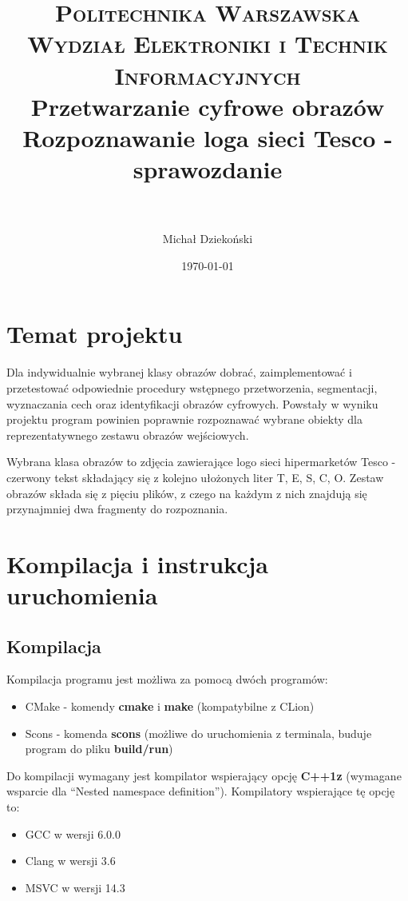\documentclass[11pt,a4paper]{article} %
\title{
\normalfont \normalsize
\textsc{Politechnika Warszawska \\Wydział Elektroniki i Technik Informacyjnych} \\ [25pt] %
\Large Przetwarzanie cyfrowe obrazów\\
\huge Rozpoznawanie loga sieci Tesco - sprawozdanie \\ %
\horrule{1pt} \\[0.5cm] %
}
\author{Michał Dziekoński} %
\date{\normalsize\today} %
\numberwithin{equation}{section} %
\numberwithin{figure}{section} %
\numberwithin{table}{section} %
\begin{document}
\maketitle %

\section{Temat projektu}

Dla  indywidualnie  wybranej  klasy  obrazów  dobrać,  zaimplementować i  przetestować odpowiednie procedury wstępnego przetworzenia, segmentacji, wyznaczania   cech oraz identyfikacji obrazów cyfrowych. Powstały w wyniku projektu program powinien poprawnie rozpoznawać wybrane obiekty dla reprezentatywnego zestawu obrazów wejściowych.

Wybrana klasa obrazów to zdjęcia zawierające logo sieci hipermarketów Tesco - czerwony tekst składający się z kolejno ułożonych liter T, E, S, C, O. Zestaw obrazów składa się z pięciu plików, z czego na każdym z nich znajdują się przynajmniej dwa fragmenty do rozpoznania.

\section{Kompilacja i instrukcja uruchomienia}

\subsection{Kompilacja}

Kompilacja programu jest możliwa za pomocą dwóch programów:
\begin{itemize}
	\item CMake - komendy \textbf{cmake} i \textbf{make} (kompatybilne z CLion)
	\item Scons - komenda \textbf{scons} (możliwe do uruchomienia z terminala, buduje program do pliku \textbf{build/run})
\end{itemize}

Do kompilacji wymagany jest kompilator wspierający opcję \textbf{C++1z} (wymagane wsparcie dla ``Nested namespace definition''). Kompilatory wspierające tę opcję to:
\begin{itemize}
	\item GCC w wersji 6.0.0
	\item Clang w wersji 3.6
	\item MSVC w wersji 14.3
\end{itemize}
\end{document}
